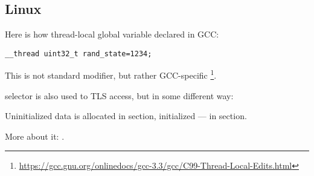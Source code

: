 \subsection{Linux}

Here is how thread-local global variable declared in GCC:

\begin{lstlisting}
__thread uint32_t rand_state=1234;
\end{lstlisting}

This is not standard \CCpp modifier, but rather GCC-specific
\footnote{\url{https://gcc.gnu.org/onlinedocs/gcc-3.3/gcc/C99-Thread-Local-Edits.html}}.

 selector is also used to \ac{TLS} access, but in some different way:



Uninitialized data is allocated in  section, initialized --- in  section.

More about it: \cite{DrepperTLS}.
